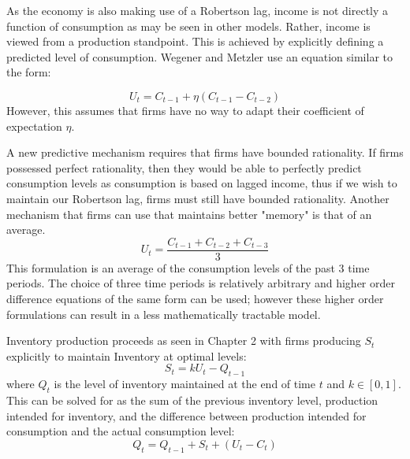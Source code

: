As the economy is also making use of a Robertson lag, income is not directly a function of consumption as may be seen in other models. Rather, income is viewed from a production standpoint. This is achieved by explicitly defining a predicted level of consumption. Wegener and Metzler use an equation similar to the form:

\begin{equation*} 
    U_t=C_{t-1}+\eta(C_{t-1}-C_{t-2})
\end{equation*}
However, this assumes that firms have no way to adapt their coefficient of expectation $\eta$. 

A new predictive mechanism requires that firms have bounded rationality. If firms possessed perfect rationality, then they would be able to perfectly predict consumption levels as consumption is based on lagged income, thus if we wish to maintain our Robertson lag, firms must still have bounded rationality. Another mechanism that firms can use that maintains better "memory" is that of an average. 
\begin{equation}\label{predict}
    U_t = \frac{C_{t-1}+C_{t-2}+C_{t-3}}{3}
\end{equation}
This formulation is an average of the consumption levels of the past 3 time periods. The choice of three time periods is relatively arbitrary and higher order difference equations of the same form can be used; however these higher order formulations can result in a less mathematically tractable model.

Inventory production proceeds as seen in Chapter 2 with firms producing $S_t$ explicitly to maintain Inventory at optimal levels:
\begin{equation}
    S_t = k U_t-Q_{t-1}
\end{equation}
where $Q_t$ is the level of inventory maintained at the end of time $t$ and $k\in[0,1]$. This can be solved for as the sum of the previous inventory level, production intended for inventory, and the difference between production intended for consumption and the actual consumption level:
\begin{equation}
    Q_t=Q_{t-1}+S_t+(U_t-C_t)
\end{equation}

